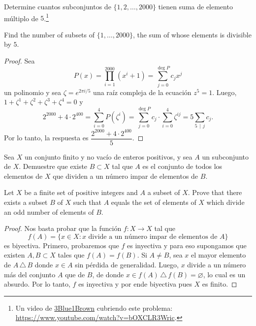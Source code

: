 \begin{probMR}
	Determine cuantos subconjuntos de $\{1,2,\dots,2000\}$ tienen suma de elemento múltiplo de $5$.\footnote{Un video de \href{https://www.youtube.com/c/3blue1brown}{3Blue1Brown} cubriendo este problema: \url{https://www.youtube.com/watch?v=bOXCLR3Wric}.}
	\begin{hint}
		Find the number of subsets of $\{1,\dots,2000\}$, the sum of whose elements is divisible by $5$.
	\end{hint}
\end{probMR}

\begin{proof}
	Sea
	\[P(x)=\prod_{i=1}^{2000}(x^i+1)=\sum_{j=0}^{\deg P}c_jx^j\]
	un polinomio y sea $\zeta=e^{2\pi i/5}$ una raíz compleja de la ecuación $z^5=1$. Luego, $1+\zeta^1+\zeta^2+\zeta^3+\zeta^4=0$ y
	\[2^{2000}+4\cdot 2^{400}=\sum_{i=0}^4 P(\zeta^i)=\sum_{j=0}^{\deg P}c_j\cdot\sum_{i=0}^4\zeta^{ij}=5\sum_{5\,\mid\,j}c_j.\]
	Por lo tanto, la respuesta es $\dfrac{2^{2000}+4\cdot 2^{400}}{5}$.
\end{proof}

\begin{probEG}[MOSP 1999]
	Sea $X$ un conjunto finito y no vacío de enteros positivos, y sea $A$ un subconjunto de $X$. Demuestre que existe $B\subset X$ tal que $A$ es el conjunto de todos los elementos de $X$ que dividen a un número impar de elementos de $B$.
	\begin{hint}
		Let $X$ be a finite set of positive integers and $A$ a subset of $X$. Prove that there exists a subset $B$ of $X$ such that $A$ equals the set of elements of $X$ which divide an odd number of elements of $B$.
	\end{hint}
\end{probEG}

\begin{proof}
	Nos basta probar que la función $f:X\to X$ tal que
	\[f(A)=\{x\in X:x\text{ divide a un número impar de elementos de }A\}\]
	es biyectiva. Primero, probaremos que $f$ es inyectiva y para eso supongamos que existen $A,B\subset X$ tales que $f(A)=f(B)$. Si $A\ne B$, sea $x$ el mayor elemento de $A\,\triangle\,B$ donde $x\in A$ sin pérdida de generalidad. Luego, $x$ divide a un número más del conjunto $A$ que de $B$, de donde $x\in f(A)\,\triangle\,f(B)=\varnothing$, lo cual es un absurdo. Por lo tanto, $f$ es inyectiva y por ende biyectiva pues $X$ es finito.
\end{proof}

